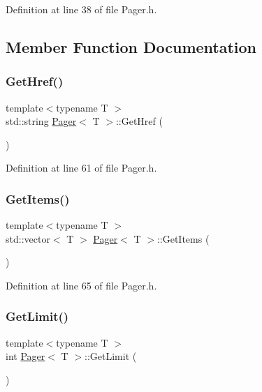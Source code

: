 Definition at line 38 of file Pager.\+h.



\subsection{Member Function Documentation}
\mbox{\label{class_pager_adb9bd9a240972d680f85b46ada1f12e0}} 
\subsubsection{\texorpdfstring{Get\+Href()}{GetHref()}}
{\footnotesize\ttfamily template$<$typename T $>$ \\
std\+::string \mbox{\hyperlink{class_pager}{Pager}}$<$ T $>$\+::Get\+Href (\begin{DoxyParamCaption}{ }\end{DoxyParamCaption})}



Definition at line 61 of file Pager.\+h.

\mbox{\label{class_pager_a16daa7a4ba8cc92deeddce04ea8075bf}} 
\subsubsection{\texorpdfstring{Get\+Items()}{GetItems()}}
{\footnotesize\ttfamily template$<$typename T $>$ \\
std\+::vector$<$ T $>$ \mbox{\hyperlink{class_pager}{Pager}}$<$ T $>$\+::Get\+Items (\begin{DoxyParamCaption}{ }\end{DoxyParamCaption})}



Definition at line 65 of file Pager.\+h.

\mbox{\label{class_pager_ab842aa447c2f10afd16cbb96ea6a5d86}} 
\subsubsection{\texorpdfstring{Get\+Limit()}{GetLimit()}}
{\footnotesize\ttfamily template$<$typename T $>$ \\
int \mbox{\hyperlink{class_pager}{Pager}}$<$ T $>$\+::Get\+Limit (\begin{DoxyParamCaption}{ }\end{DoxyParamCaption})}



